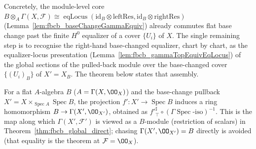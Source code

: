 Concretely, the module-level core
\(B \otimes_A \Gamma(X,\mathcal{F}) \cong \operatorname{eqLocus}(\mathrm{id}_B\otimes\mathrm{leftRes},
\mathrm{id}_B\otimes\mathrm{rightRes})\) (Lemma~\ref{lem:fbcb_baseChangeGammaEquiv}) already commutes flat
base change past the finite \(H^0\) equalizer of a cover \(\{U_i\}\) of \(X\). The single remaining step
is to recognise the right-hand base-changed equalizer, chart by chart, as the equalizer-locus
presentation (Lemma~\ref{lem:fbcb_gammaTopEquivEqLocus}) of the global sections of the pulled-back module
over the base-changed cover \(\{(U_i)_B\}\) of \(X' = X_B\). The theorem below states that assembly.

\begin{definition}
  \label{def:fbcb_pullbackGroundRingAlg}
  For a flat \(A\)-algebra \(B\) (\(A = \Gamma(X,\OO_X)\)) and the base-change pullback
  \(X' = X \times_{\operatorname{Spec} A} \operatorname{Spec} B\), the projection
  \(f' : X' \to \operatorname{Spec} B\) induces a ring homomorphism
  \(B \to \Gamma(X',\OO_{X'})\), obtained as
  \(f'^{\sharp}_{\top} \circ (\Gamma\!\operatorname{Spec}\text{-iso})^{-1}\). This is the
  map along which \(\Gamma(X',\mathcal{F}')\) is viewed as a \(B\)-module (restriction of
  scalars) in Theorem~\ref{thm:fbcb_global_direct}; chasing \(\Gamma(X',\OO_{X'}) = B\)
  directly is avoided (that equality is the theorem at \(\mathcal{F} = \OO_X\)).
\end{definition}


